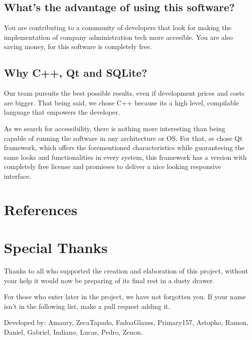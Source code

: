 \documentclass[a4paper,12pt]{article}
\begin{document}
		\subsection{What's the advantage of using this software?}
			You are contributing to a community of developers that look for making the implementation of company administration tech more accesible. You are also saving money, for this software is completely free.
		\subsection{Why C++, Qt and SQLite?}
			Our team pursuits the best possible results, even if development prices and costs are bigger. That being said, we chose C++ because its a high level, compilable language that empowers the developer.
			
			As we search for accessibility, there is nothing more interesting than being capable of running the software in any architecture or OS. For that, se chose Qt framework, which offers the forementioned characteristics while guaranteeing the same looks and functionalities in every system, this framework has a version with completely free license and promieses to deliver a nice looking responsive interface. 
	\section{References}
	\section{Special Thanks}
		Thanks to all who supported the creation and elaboration of this project, without your help it would now be preparing of its final rest in a dusty drawer. 
		
		For those who enter later in the project, we have not forgotten you. If your name isn't in the following list, make a pull request adding it.
		
		Developed by: Amaury, ZecaTapado, FadoaGlauss, Primary157, Astopho, Ramon, Daniel, Gabriel, Indiano, Lucas, Pedro, Zenon.
\end{document}
